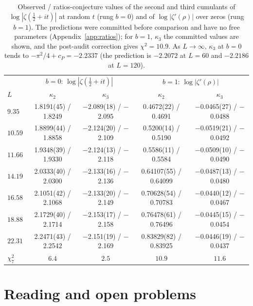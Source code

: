 \documentclass[12pt]{amsart}
\theoremstyle{remark}
\newcommand{\1}{\mathbf{1}}
\begin{document}
\begin{table}[h]
\centering
\footnotesize
\setlength{\tabcolsep}{4pt}
\begin{tabular}{lcccc}
\toprule
& \multicolumn{2}{c}{$b=0$: $\log|\zeta(\frac12+it)|$} & \multicolumn{2}{c}{$b=1$: $\log|\zeta'(\rho)|$}\\
$L$ & $\kappa_2$ & $\kappa_3$ & $\kappa_2$ & $\kappa_3$\\
\midrule
$9.35$ & 1.8191(45) / 1.8249 & $-$2.089(18) / $-$2.095 & 0.4672(22) / 0.4691 & $-$0.0465(27) / $-$0.0488\\
$10.59$ & 1.8899(44) / 1.8858 & $-$2.124(20) / $-$2.109 & 0.5200(14) / 0.5190 & $-$0.0519(21) / $-$0.0492\\
$11.66$ & 1.9348(39) / 1.9330 & $-$2.124(13) / $-$2.118 & 0.5586(11) / 0.5584 & $-$0.0509(10) / $-$0.0490\\
$14.19$ & 2.0333(40) / 2.0300 & $-$2.133(16) / $-$2.136 & 0.64107(55) / 0.64099 & $-$0.0487(13) / $-$0.0480\\
$16.58$ & 2.1051(42) / 2.1068 & $-$2.133(20) / $-$2.149 & 0.70628(54) / 0.70783 & $-$0.0440(12) / $-$0.0467\\
$18.88$ & 2.1729(40) / 2.1714 & $-$2.153(17) / $-$2.158 & 0.76478(61) / 0.76496 & $-$0.0445(15) / $-$0.0454\\
$22.31$ & 2.2471(43) / 2.2542 & $-$2.151(19) / $-$2.169 & 0.83829(82) / 0.83925 & $-$0.0446(19) / $-$0.0437\\
\midrule
$\chi^2_7$ & $6.4$ & $2.5$ & $10.9$ & $11.6$\\
\bottomrule
\end{tabular}
\caption{\label{tab:ratios}Observed / ratios-conjecture values of the
second and third cumulants of $\log|\zeta(\frac12+it)|$ at random $t$
(rung $b=0$) and of $\log|\zeta'(\rho)|$ over zeros (rung $b=1$). The
predictions were committed before comparison and have no free parameters
(Appendix~\ref{app:ratios}); for $b=1$, $\kappa_3$ the committed values are
shown, and the post-audit correction gives $\chi^2=10.9$. As
$L\to\infty$, $\kappa_3$ at $b=0$ tends to $-\pi^2/4+c_P=-2.2337$ (the
prediction is $-2.2072$ at $L=60$ and $-2.2186$ at $L=120$).}
\end{table}

\section{Reading and open problems}\label{sec:open}
\end{document}
